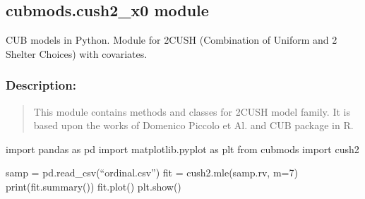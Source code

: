 \documentclass[letterpaper,10pt,english]{sphinxmanual}
\begin{document}
\subsection{cubmods.cush2\_x0 module}
\label{\detokenize{cubmods:module-cubmods.cush2_x0}}\label{\detokenize{cubmods:cubmods-cush2-x0-module}}
\sphinxAtStartPar
CUB models in Python.
Module for 2\sphinxhyphen{}CUSH (Combination of Uniform
and 2 Shelter Choices) with covariates.


\subsubsection{Description:}
\label{\detokenize{cubmods:id198}}\begin{quote}

\sphinxAtStartPar
This module contains methods and classes
for 2\sphinxhyphen{}CUSH model family.
It is based upon the works of Domenico
Piccolo et Al. and CUB package in R.
\end{quote}
\begin{description}
\sphinxAtStartPar
import pandas as pd
import matplotlib.pyplot as plt
from cubmods import cush2

\sphinxAtStartPar
samp = pd.read\_csv(“ordinal.csv”)
fit = cush2.mle(samp.rv, m=7)
print(fit.summary())
fit.plot()
plt.show()

\end{description}
\end{document}
